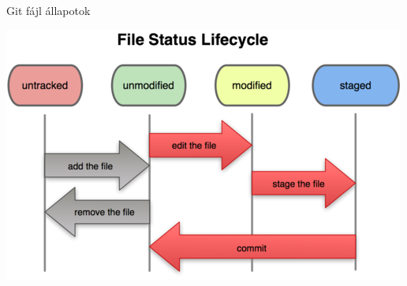 
\begin{frame}{Git fájl állapotok}
    \begin{center}
        \includegraphics{frames/diagrams/state-lifecycle.png}
    \end{center}
\end{frame}

